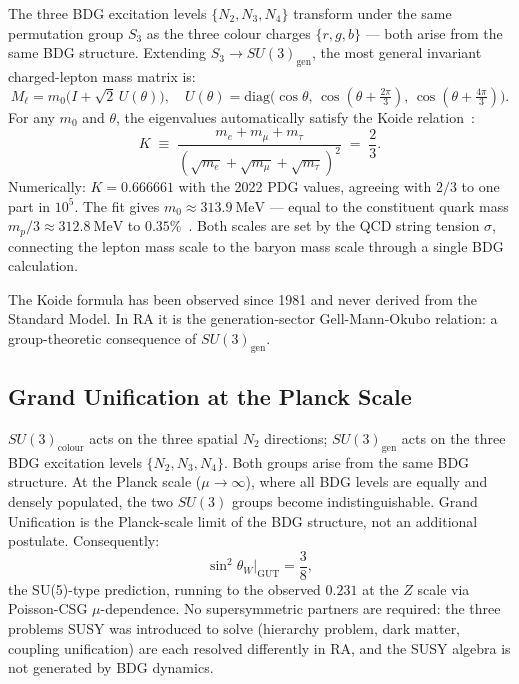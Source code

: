 \documentclass[11pt,a4paper]{article}
\begin{document}
The three BDG excitation levels $\{N_2, N_3, N_4\}$ transform under the
same permutation group $S_3$ as the three colour charges $\{r, g, b\}$
--- both arise from the same BDG structure. Extending $S_3 \to
SU(3)_{\mathrm{gen}}$, the most general invariant charged-lepton mass
matrix is:
\begin{equation}
  M_\ell = m_0\bigl(I + \sqrt{2}\,U(\theta)\bigr), \quad
  U(\theta) = \mathrm{diag}\bigl(\cos\theta,\,
  \cos(\theta + \tfrac{2\pi}{3}),\,
  \cos(\theta + \tfrac{4\pi}{3})\bigr).
  \label{eq:koide_matrix}
\end{equation}
For any $m_0$ and $\theta$, the eigenvalues automatically satisfy the
Koide relation~\citep{Koide1983}:
\begin{equation}
  K \;\equiv\; \frac{m_e + m_\mu + m_\tau}{(\sqrt{m_e} + \sqrt{m_\mu}
  + \sqrt{m_\tau})^2} \;=\; \frac{2}{3}.
  \label{eq:koide}
\end{equation}
Numerically: $K = 0.666661$ with the 2022 PDG values, agreeing with $2/3$
to one part in $10^5$. The fit gives $m_0 \approx 313.9~\mathrm{MeV}$
--- equal to the constituent quark mass $m_p/3 \approx 312.8~\mathrm{MeV}$
to $0.35\%$~\citep{Sandeman2026RASM}. Both scales are set by the QCD
string tension $\sigma$, connecting the lepton mass scale to the baryon
mass scale through a single BDG calculation.

The Koide formula has been observed since 1981 and never derived from
the Standard Model. In RA it is the generation-sector Gell-Mann-Okubo
relation: a group-theoretic consequence of $SU(3)_{\mathrm{gen}}$.

\subsection{Grand Unification at the Planck Scale}

$SU(3)_{\mathrm{colour}}$ acts on the three spatial $N_2$ directions;
$SU(3)_{\mathrm{gen}}$ acts on the three BDG excitation levels $\{N_2,
N_3, N_4\}$. Both groups arise from the same BDG structure. At the
Planck scale ($\mu \to \infty$), where all BDG levels are equally and
densely populated, the two $SU(3)$ groups become indistinguishable.
Grand Unification is the Planck-scale limit of the BDG structure,
not an additional postulate. Consequently:
\begin{equation}
  \sin^2\theta_W\big|_{\mathrm{GUT}} = \frac{3}{8},
  \label{eq:weinberg}
\end{equation}
the SU(5)-type prediction, running to the observed $0.231$ at the
$Z$ scale via Poisson-CSG $\mu$-dependence. No supersymmetric partners
are required: the three problems SUSY was introduced to solve (hierarchy
problem, dark matter, coupling unification) are each resolved differently
in RA, and the SUSY algebra is not generated by BDG dynamics.
\end{document}
